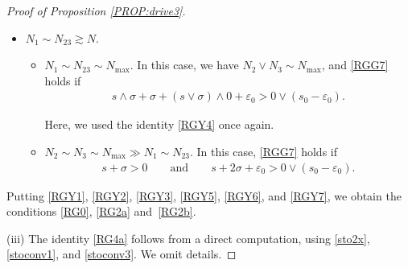 \documentclass[letterpaper, 11pt,  reqno]{amsart}
\newcommand{\1}{\hspace{0.5mm}\textup{I}\hspace{0.5mm}}
\newcommand{\noi}{\noindent}
\newcommand{\eps}{\varepsilon}
\newcommand{\s}{\sigma}
\newcommand{\ges}{\gtrsim}
\numberwithin{equation}{section}
\numberwithin{theorem}{section}
\begin{document}
\begin{proof} [Proof of Proposition \ref{PROP:drive3}]
\begin{itemize}
\smallskip
\item[(c)] 
$N_1\sim N_{23} \ges N$.

\smallskip
\begin{itemize}
\item[(c.i)] 
$N_1\sim N_{23}  \sim N_{\max}$.
In this case, we have $N_2 \vee N_3 \sim N_{\max}$, 
and \eqref{RGG7} holds if 
\begin{align}
s\wedge \s + \s + (s\vee \s) \wedge 0+ \eps_0 > 0 \vee (s_0 - \eps_0).
\label{RGY6}
\end{align}

\noi
Here,  we used the identity \eqref{RGY4} once again.

\smallskip
\item[(c.ii)]
 $N_2 \sim N_3\sim N_{\max} \gg N_1\sim N_{23}$.
In this case, 
\eqref{RGG7} holds if 
\begin{align}
s + \s > 0
\qquad \text{and}
\qquad  
s + 2\s + \eps_0 > 0\vee (s_0 - \eps_0). 
\label{RGY7}
\end{align}


\end{itemize}



\end{itemize}

\noi
Putting \eqref{RGY1}, \eqref{RGY2}, \eqref{RGY3}, 
\eqref{RGY5}, \eqref{RGY6}, and \eqref{RGY7}, 
we obtain the conditions \eqref{RG0}, \eqref{RG2a} and~\eqref{RG2b}.





\medskip

\noi
(iii)
The identity \eqref{RG4a}
follows from 
a direct computation, using \eqref{sto2x}, \eqref{stoconv1},  and \eqref{stoconv3}.
We omit details.
\end{proof}




















 
 
 
 
 
 
\end{document}
